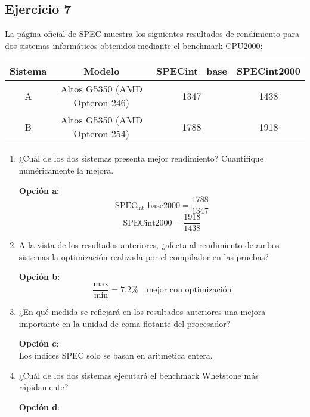 \subsection{Ejercicio 7}
\noindent
La página oficial de SPEC muestra los siguientes resultados de rendimiento para dos sistemas informáticos obtenidos mediante el benchmark CPU2000:
\begin{table}[H]
\centering
\begin{tabular}{|c|c|c|c|}
\hline
\textbf{Sistema} & \textbf{Modelo}               & \textbf{SPECint\_base} & \textbf{SPECint2000} \\ \hline
A                & Altos G5350 (AMD Opteron 246) & 1347                   & 1438                 \\ \hline
B                & Altos G5350 (AMD Opteron 254) & 1788                   & 1918                 \\ \hline
\end{tabular}
\end{table}
\begin{enumerate}
    \item ¿Cuál de los dos sistemas presenta mejor rendimiento? Cuantifique numéricamente la mejora.
\begin{tcolorbox}[colback=white,colframe=cyan!50!black,fonttitle=\bfseries]
\textbf{Opción a}:
\[
\text{SPEC}_{\text{int}}\_\text{base2000}=\dfrac{1788}{1347}
\]
\[
\text{SPECint2000}=\dfrac{1918}{1438}
\]
\end{tcolorbox}    
    \item A la vista de los resultados anteriores, ¿afecta al rendimiento de ambos sistemas la optimización realizada por el compilador en las pruebas?
\begin{tcolorbox}[colback=white,colframe=cyan!50!black,fonttitle=\bfseries]
\textbf{Opción b}:
\[
\dfrac{\text{max}}{\text{min}}=7.2\%\quad\text{mejor con optimización}
\]
\end{tcolorbox}    
    \item ¿En qué medida se reflejará en los resultados anteriores una mejora importante en la unidad de coma flotante del procesador?
\begin{tcolorbox}[colback=white,colframe=cyan!50!black,fonttitle=\bfseries]
\textbf{Opción c}:\\
Los índices SPEC solo se basan en aritmética entera.
\end{tcolorbox}    
    \item ¿Cuál de los dos sistemas ejecutará el benchmark Whetstone más rápidamente?
\begin{tcolorbox}[colback=white,colframe=cyan!50!black,fonttitle=\bfseries]
\textbf{Opción d}:
\end{tcolorbox}    
\end{enumerate}
